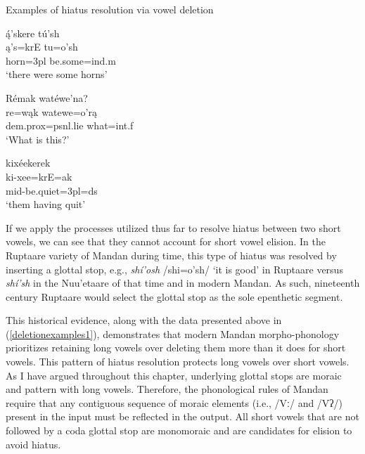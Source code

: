 \begin{exe}
\item\label{deletionexamples1} Examples of hiatus resolution via vowel deletion

\begin{xlist}
\item\label{deletionexamples1a}
\glll ą́'skere tú'sh\\
	ą's=krE tu=o'sh\\
	\textnormal{horn}=3pl \textnormal{be.some}=ind.m\\
\glt	`there were some horns' \citep[20]{trechter2012b}

\item\label{deletionexamples1b}
\glll Rémak watéwe'na?\\
	re=wąk watewe=o'rą\\
	dem.prox=psnl.lie \textnormal{what}=int.f\\
\glt	`What is this?' \citep[7]{kasak2014}

\item\label{deletionexamples1c}
\glll	kixéekerek\\
	ki-xee=krE=ak\\
	mid-\textnormal{be.quiet}=3pl=ds\\
\glt	`them having quit' \citep[430]{hollow1970}

\end{xlist}

\end{exe}

If we apply the processes utilized thus far to resolve hiatus between two short vowels, we can see that they cannot account for short vowel elision. In the Ruptaare variety of Mandan during  time, this type of hiatus was resolved by inserting a glottal stop, e.g., \textit{shí'osh} /shi=o'sh/ `it is good' in Ruptaare versus \textit{shí'sh} in the Nuu'etaare of that time and in modern Mandan. As such, nineteenth century Ruptaare would select the glottal stop as the sole epenthetic segment.


This historical evidence, along with the data presented above in (\ref{deletionexamples1}), demonstrates that modern Mandan morpho-phonology prioritizes retaining long vowels over deleting them more than it does for short vowels. This pattern of hiatus resolution protects long vowels over short vowels. As I have argued throughout this chapter, underlying glottal stops are moraic and pattern with long vowels. Therefore, the phonological rules of Mandan require that any contiguous sequence of moraic elements (i.e., /Vː/ and /Vʔ/) present in the input must be reflected in the output. All short vowels that are not followed by a coda glottal stop are monomoraic and are candidates for elision to avoid hiatus.


